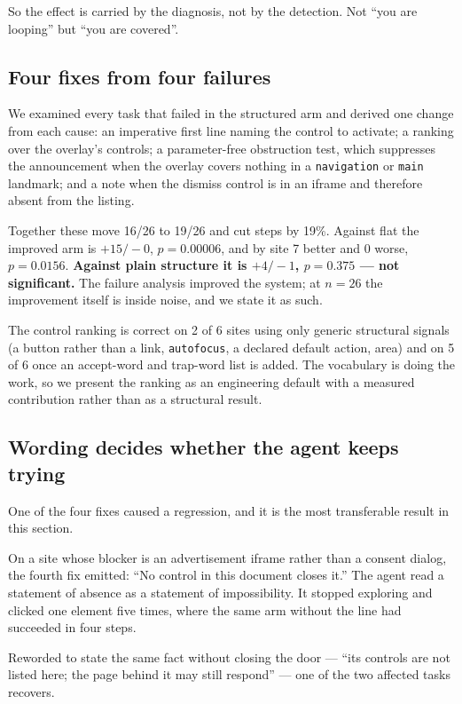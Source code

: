 \documentclass[conference]{IEEEtran}
\begin{document}
So the effect is carried by the diagnosis, not by the detection. Not ``you are
looping'' but ``you are covered''.

\subsection{Four fixes from four failures}
\label{sec:fixes}

We examined every task that failed in the structured arm and derived one change
from each cause: an imperative first line naming the control to activate; a
ranking over the overlay's controls; a parameter-free obstruction test, which
suppresses the announcement when the overlay covers nothing in a
\texttt{navigation} or \texttt{main} landmark; and a note when the dismiss
control is in an iframe and therefore absent from the listing.

Together these move 16/26 to 19/26 and cut steps by 19\%. Against flat the
improved arm is $+15/-0$, $p = 0.00006$, and by site 7 better and 0 worse,
$p = 0.0156$. \textbf{Against plain structure it is $+4/-1$, $p = 0.375$ ---
not significant.} The failure analysis improved the system; at $n = 26$ the
improvement itself is inside noise, and we state it as such.

The control ranking is correct on 2 of 6 sites using only generic structural
signals (a button rather than a link, \texttt{autofocus}, a declared default
action, area) and on 5 of 6 once an accept-word and trap-word list is added. The
vocabulary is doing the work, so we present the ranking as an engineering
default with a measured contribution rather than as a structural result.

\subsection{Wording decides whether the agent keeps trying}

One of the four fixes caused a regression, and it is the most transferable
result in this section.

On a site whose blocker is an advertisement iframe rather than a consent
dialog, the fourth fix emitted: ``No control in this document closes it.'' The
agent read a statement of absence as a statement of impossibility. It stopped
exploring and clicked one element five times, where the same arm without the
line had succeeded in four steps.

Reworded to state the same fact without closing the door --- ``its controls are
not listed here; the page behind it may still respond'' --- one of the two
affected tasks recovers.
\end{document}
